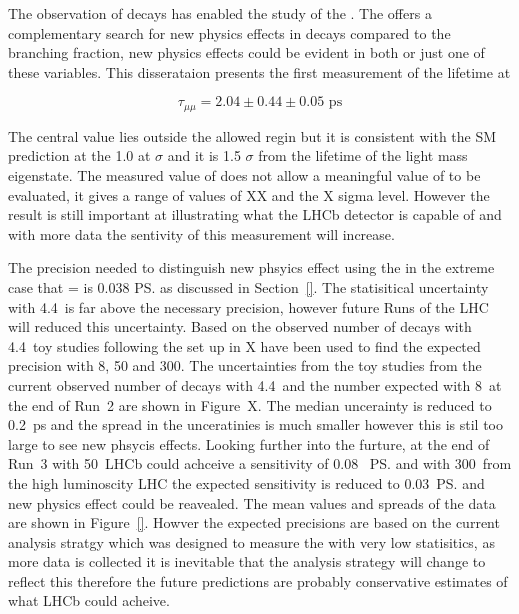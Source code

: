 The observation of \bsmumu decays has enabled the study of the \bsmumu \el. The \el offers a complementary search for new physics effects in \bsmumu decays compared to the branching fraction, new physics effects could be evident in both or just one of these variables. This disserataion presents the first measurement of the \bsmumu \el lifetime at

\begin{equation}
\tau_{\mu\mu} = 2.04 \pm 0.44  \pm 0.05 \text{ ps}
\end{equation}

The central value lies outside the allowed regin but it is consistent with the SM prediction at the 1.0 at $\sigma$ and it is 1.5 $\sigma$ from the lifetime of the light \bs mass eigenstate. The measured value of \tmumu does not allow a meaningful value of \ADG to be evaluated, it gives a range of \ADG values of XX and the X sigma level. However the result is still important at illustrating what the LHCb detector is capable of and with more data the sentivity of this measurement will increase. 

The precision needed to distinguish new phsyics effect using the \bsmumu \el in the extreme case that \tmumu = \tL is 0.038 \ps as discussed in Section~\ref{}. The statisitical uncertainty with 4.4~\fb is far above the necessary precision, however future Runs of the LHC will reduced this uncertainty. Based on the observed number of decays with 4.4~\fb toy studies following the set up in X have been used to find the expected precision with 8, 50 and 300\fb. The uncertainties from the toy studies from the current observed number of decays with 4.4~\fb and the number expected with 8~\fb at the end of Run~2 are shown in Figure~X. The median uncerainty is reduced to 0.2~ps and the spread in the unceratinies is much smaller however this is stil too large to see new phsycis effects. Looking further into the furture, at the end of Run~3 with 50~\fb LHCb could achceive a sensitivity of 0.08 ~\ps and with 300~\fb from the high luminoscity LHC the expected sensitivity is reduced to 0.03~\ps and new physics effect could be reavealed. The mean values and spreads of the data are shown in Figure~\ref{}. Howver the expected precisions are based on the current analysis stratgy which was designed to measure the \bsmumu \el with very low statisitics, as more data is collected it is inevitable that the analysis strategy will change to reflect this therefore the future predictions are probably conservative estimates of what LHCb could acheive. 

